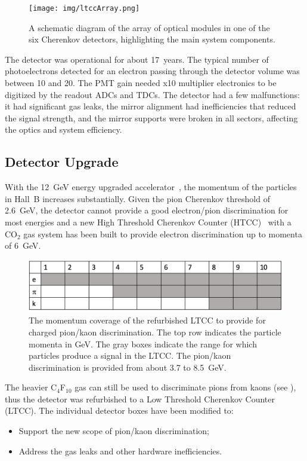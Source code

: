 \begin{figure}[ht]
	\centering
	\texttt{[image: img/ltccArray.png]}
	\caption{A schematic diagram of the array of optical modules in one of the six Cherenkov detectors, highlighting
          the main system components.}
	\label{fig:ltccArray}
\end{figure}

The detector was operational for about 17~years. The typical number of photoelectrons detected for an electron
passing through the detector volume was between 10 and 20. The PMT gain needed x10 multiplier electronics to be
digitized by the readout ADCs and TDCs. The detector had a few malfunctions: it had significant gas leaks, the
mirror alignment had inefficiencies that reduced the signal strength, and the mirror supports were broken in all
sectors, affecting the optics and system efficiency.

\subsection{Detector Upgrade}

With the 12~GeV energy upgraded accelerator~\cite{TDR12}, the momentum of the particles in Hall~B increases
substantially. Given the pion Cherenkov threshold of 2.6~GeV, the detector cannot provide a good electron/pion
discrimination for most energies and a new High Threshold Cherenkov Counter (HTCC)~\cite{htcc-nim} with a
CO$_2$ gas system has been built to provide electron discrimination up to momenta of 6~GeV.

\begin{figure}[htbp]
	\centering
	\includegraphics[width=0.99\columnwidth,keepaspectratio]{img/newScope.png}
	\caption{The momentum coverage of the refurbished LTCC to provide for charged pion/kaon discrimination.
          The top row indicates the particle momenta in GeV. The gray boxes indicate the range for which particles
          produce a signal in the LTCC. The pion/kaon discrimination is provided from about 3.7 to 8.5~GeV.}
	\label{fig:newScope}
\end{figure}

The heavier C$_4$F$_{10}$ gas can still be used to discriminate pions from kaons (see ), thus the
detector was refurbished to a Low Threshold Cherenkov Counter (LTCC). The individual detector boxes have
been modified to:

\begin{itemize}
	\item Support the new scope of pion/kaon discrimination;
	\item Address the gas leaks and other hardware inefficiencies.
\end{itemize}
